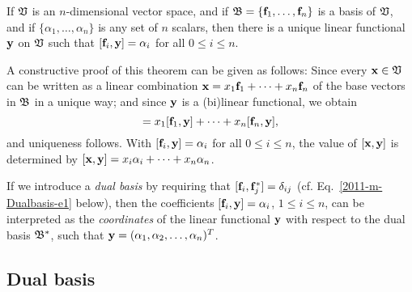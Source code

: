 If ${\frak V}$ is an $n$-dimensional vector space, and if ${\frak B} = \{{\bf f}_1,\ldots , {\bf f}_n\}$
is a basis of  ${\frak V}$, and if
$\{\alpha_1, \ldots ,\alpha_n\}$  is any set of $n$ scalars, then there is
a unique linear functional ${\bf y}$  on  ${\frak V}$ such that
$ [ {\bf f}_i, {\bf y}] = \alpha_i $ for all $0\le i \le n$.

A constructive proof of this theorem can be given as follows:
Since every ${\bf x}\in {\frak V}$
can be written as a linear combination
$ {\bf x} = x_1 {\bf f}_1 +\cdots + x_n {\bf f}_n$
of the base vectors in ${\frak B}$ in a unique way;
and since ${\bf y}$ is a (bi)linear functional, we obtain
\begin{equation}
[{\bf x},{\bf y}]
=
x_1 [{\bf f}_1 ,{\bf y}] +\cdots + x_n [{\bf f}_n ,{\bf y}] ,
\end{equation}
and uniqueness follows.
With $[{\bf f}_i ,{\bf y}] = \alpha_i$  for all  $0\le i \le n$,
the value of
$[{\bf x},{\bf y}]$ is determined by
$[{\bf x},{\bf y}] = x_i\alpha_i + \cdots + x_n\alpha_n$.

If we introduce a {\em dual basis}
by requiring that $[{\bf f}_i,  {\bf f}_j^*]=\delta_{ij}$ (cf. Eq.~\ref{2011-m-Dualbasis-e1} below),
then the coefficients $[{\bf f}_i ,{\bf y}] = \alpha_i$,
$1\le i \le n$, can be interpreted
as the {\em coordinates} of the linear functional ${\bf y}$ with respect to the dual
basis ${\frak B}^\ast$, such that ${\bf y}=(\alpha_1,\alpha_2,\ldots , \alpha_n)^T$.

\subsection{Dual basis}
\label{2011-m-Dualbasis}

